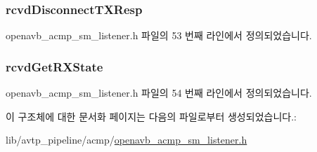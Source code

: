 \subsubsection[{\texorpdfstring{rcvd\+Disconnect\+T\+X\+Resp}{rcvdDisconnectTXResp}}]{ rcvd\+Disconnect\+T\+X\+Resp}\hypertarget{structopenavb__acmp__sm__listener__vars__t_a4bf7e0fee4c54313be69ab20a00febc2}{}\label{structopenavb__acmp__sm__listener__vars__t_a4bf7e0fee4c54313be69ab20a00febc2}


openavb\+\_\+acmp\+\_\+sm\+\_\+listener.\+h 파일의 53 번째 라인에서 정의되었습니다.

\subsubsection[{\texorpdfstring{rcvd\+Get\+R\+X\+State}{rcvdGetRXState}}]{ rcvd\+Get\+R\+X\+State}\hypertarget{structopenavb__acmp__sm__listener__vars__t_af56e1d20679599f0ae07e62ef34648a2}{}\label{structopenavb__acmp__sm__listener__vars__t_af56e1d20679599f0ae07e62ef34648a2}


openavb\+\_\+acmp\+\_\+sm\+\_\+listener.\+h 파일의 54 번째 라인에서 정의되었습니다.



이 구조체에 대한 문서화 페이지는 다음의 파일로부터 생성되었습니다.\+:\begin{DoxyCompactItemize}
\item 
lib/avtp\+\_\+pipeline/acmp/\hyperlink{openavb__acmp__sm__listener_8h}{openavb\+\_\+acmp\+\_\+sm\+\_\+listener.\+h}\end{DoxyCompactItemize}
